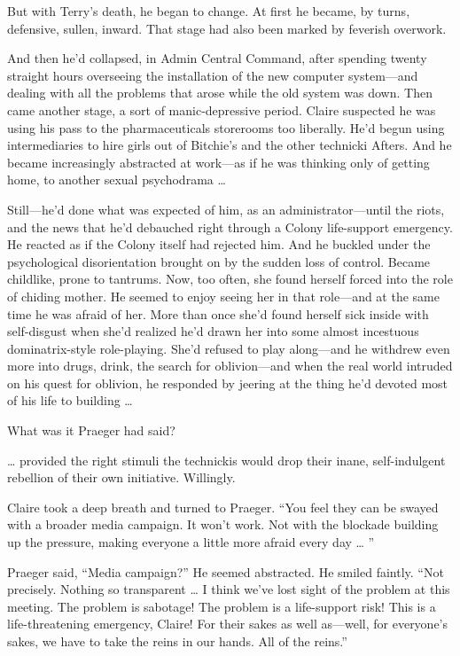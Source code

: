But with Terry’s death, he began to change. At first he became, by turns, defensive, sullen, inward. That stage had also been marked by feverish overwork.

And then he’d collapsed, in Admin Central Command, after spending twenty straight hours overseeing the installation of the new computer system—and dealing with all the problems that arose while the old system was down. Then came another stage, a sort of manic-depressive period. Claire suspected he was using his pass to the pharmaceuticals storerooms too liberally. He’d begun using intermediaries to hire girls out of Bitchie’s and the other technicki Afters. And he became increasingly abstracted at work—as if he was thinking only of getting home, to another sexual psychodrama …

Still—he’d done what was expected of him, as an administrator—until the riots, and the news that he’d debauched right through a Colony life-support emergency. He reacted as if the Colony itself had rejected him. And he buckled under the psychological disorientation brought on by the sudden loss of control. Became childlike, prone to tantrums. Now, too often, she found herself forced into the role of chiding mother. He seemed to enjoy seeing her in that role—and at the same time he was afraid of her. More than once she’d found herself sick inside with self-disgust when she’d realized he’d drawn her into some almost incestuous dominatrix-style role-playing. She’d refused to play along—and he withdrew even more into drugs, drink, the search for oblivion—and when the real world intruded on his quest for oblivion, he responded by jeering at the thing he’d devoted most of his life to building …

What was it Praeger had said?

… provided the right stimuli the technickis would drop their inane, self-indulgent rebellion of their own initiative. Willingly.

Claire took a deep breath and turned to Praeger. “You feel they can be swayed with a broader media campaign. It won’t work. Not with the blockade building up the pressure, making everyone a little more afraid every day … ”

Praeger said, “Media campaign?” He seemed abstracted. He smiled faintly. “Not precisely. Nothing so transparent … I think we’ve lost sight of the problem at this meeting. The problem is sabotage! The problem is a life-support risk! This is a life-threatening emergency, Claire! For their sakes as well as—well, for everyone’s sakes, we have to take the reins in our hands. All of the reins.”

